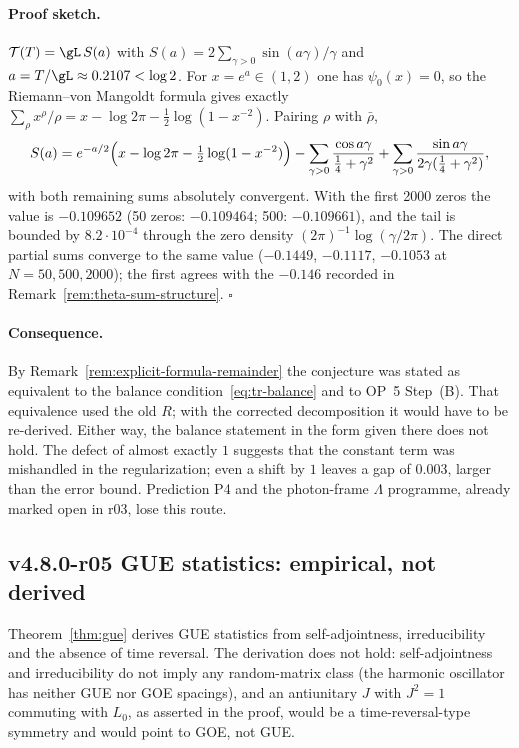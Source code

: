 \paragraph{Proof sketch.}
\(\mathcal T(T)=\gL\,S(a)\) with \(S(a)=2\sum_{\gamma>0}\sin(a\gamma)/\gamma\) and
\(a=T/\gL\approx0.2107<\log2\).  For \(x=e^a\in(1,2)\) one has \(\psi_0(x)=0\), so the
Riemann--von Mangoldt formula gives exactly
\(\sum_\rho x^\rho/\rho=x-\log2\pi-\tfrac12\log(1-x^{-2})\).  Pairing \(\rho\) with \(\bar\rho\),
\[
S(a)=e^{-a/2}\Bigl(x-\log2\pi-\tfrac12\log(1-x^{-2})\Bigr)
-\sum_{\gamma>0}\frac{\cos a\gamma}{\tfrac14+\gamma^2}
+\sum_{\gamma>0}\frac{\sin a\gamma}{2\gamma(\tfrac14+\gamma^2)},
\]
with both remaining sums absolutely convergent.  With the first 2000 zeros the value is
\(-0.109652\) (50 zeros: \(-0.109464\); 500: \(-0.109661\)), and the tail is bounded by
\(8.2\cdot10^{-4}\) through the zero density \((2\pi)^{-1}\log(\gamma/2\pi)\).  The direct partial sums
converge to the same value (\(-0.1449\), \(-0.1117\), \(-0.1053\) at \(N=50,500,2000\)); the
first agrees with the \(-0.146\) recorded in Remark~\ref{rem:theta-sum-structure}.  \(\square\)

\paragraph{Consequence.}
By Remark~\ref{rem:explicit-formula-remainder} the conjecture was stated as equivalent to the
balance condition~\eqref{eq:tr-balance} and to OP~5 Step~(B).  That equivalence used the old
\(R\); with the corrected decomposition it would have to be re-derived.  Either way, the balance
statement in the form given there does not hold.  The defect of almost exactly \(1\) suggests that
the constant term was mishandled in the regularization; even a shift by \(1\) leaves a gap of
\(0.003\), larger than the error bound.  Prediction P4 and the photon-frame \(\Lambda\) programme,
already marked open in r03, lose this route.

\subsection*{v4.8.0-r05 GUE statistics: empirical, not derived}
\label{subsec:v480-r05-gue}

Theorem~\ref{thm:gue} derives GUE statistics from self-adjointness, irreducibility and the
absence of time reversal.  The derivation does not hold: self-adjointness and irreducibility do not
imply any random-matrix class (the harmonic oscillator has neither GUE nor GOE spacings), and an
antiunitary \(J\) with \(J^2=1\) commuting with \(L_0\), as asserted in the proof, would be a
time-reversal-type symmetry and would point to GOE, not GUE.


